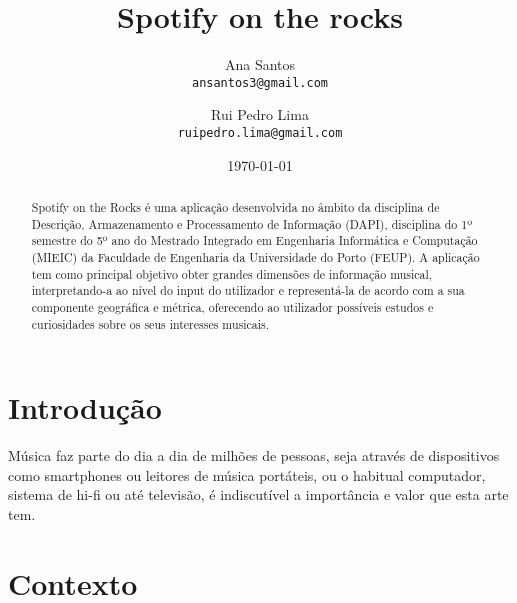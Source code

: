 \documentclass[twocolumn,twoside,11pt,a4paper]{article}
\title{\vspace{-15mm}\fontsize{24pt}{10pt}\selectfont\textbf{Spotify on the rocks}}
\author{Ana Santos\\
\small \texttt{ansantos3@gmail.com}\\
\and
Rui Pedro Lima\\
\small \texttt{ruipedro.lima@gmail.com}
\vspace{-5mm}
}
\date{\today}
\begin{document}
\maketitle
\thispagestyle{plain}            %


\begin{abstract}


Spotify on the Rocks é uma aplicação desenvolvida no âmbito da disciplina de Descrição,
Armazenamento e Processamento de Informação (DAPI), disciplina do 1º semestre do 5º ano
do Mestrado Integrado em Engenharia Informática e Computação (MIEIC) da Faculdade de
Engenharia da Universidade do Porto (FEUP).
A aplicação tem como principal objetivo obter grandes dimensões de informação musical,
interpretando-a ao nível do input do utilizador e representá-la de acordo com a sua
componente geográfica e métrica, oferecendo ao utilizador possíveis estudos e curiosidades
sobre os seus interesses musicais.

\end{abstract}


\section{Introdução}\label{sec:intro}


Música faz parte do dia a dia de milhões de pessoas, seja através de dispositivos como
smartphones ou leitores de música portáteis, ou o habitual computador, sistema de hi-fi
ou até televisão, é indiscutível a importância e valor que esta arte tem.


\section{Contexto}\label{sec:application}
\end{document}
